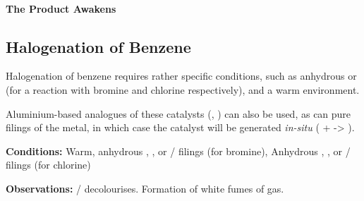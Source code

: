 			\paragraph{The Product Awakens}
















		\pagebreak
		\subsection{Halogenation of Benzene}

			Halogenation of benzene requires rather specific conditions, such as anhydrous  or  (for a reaction
			with bromine and chlorine respectively), and a warm environment.

			Aluminium-based analogues of these catalysts (, ) can also be used, as can pure
			filings of the metal, in which case the catalyst will be generated \textit{in-situ} ( +  -> ).


			\vspace{1.5em}
			\vbox{\textbf{Conditions:}	\tabto{35mm}Warm, anhydrous , , or  / \ch{\aluminium} filings (for bromine),
										\tabto{35mm}Anhydrous , , or
													 / \ch{\aluminium} filings (for chlorine)}

			\vspace{0.75em}
			\vbox{\textbf{Observations:}\tabto{35mm}  /   decolourises.
										\tabto{35mm}Formation of white fumes of  gas.}


			\hypertarget{BenzeneHalogenationCatalyst}{}
